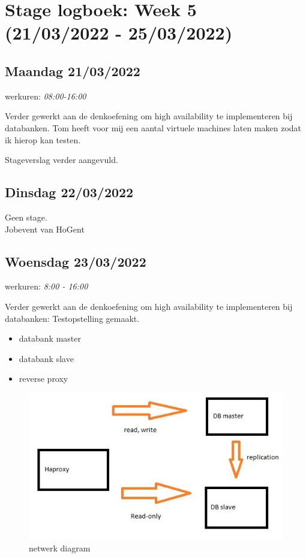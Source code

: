 \documentclass[
]{article}
\author{}
\date{}
\providecommand{\tightlist}{%
  \setlength{\itemsep}{0pt}\setlength{\parskip}{0pt}}
\begin{document}
\hypertarget{stage-logboek-week-5-21032022---25032022}{%
\section{Stage logboek: Week 5 (21/03/2022 -
25/03/2022)}\label{stage-logboek-week-5-21032022---25032022}}

\hypertarget{maandag-21032022}{%
\subsection{Maandag 21/03/2022}\label{maandag-21032022}}

werkuren: \emph{08:00-16:00}

Verder gewerkt aan de denkoefening om high availability te implementeren
bij databanken. Tom heeft voor mij een aantal virtuele machines laten
maken zodat ik hierop kan testen.

Stageverslag verder aangevuld.

\hypertarget{dinsdag-22032022}{%
\subsection{Dinsdag 22/03/2022}\label{dinsdag-22032022}}

Geen stage.\\
Jobevent van HoGent

\hypertarget{woensdag-23032022}{%
\subsection{Woensdag 23/03/2022}\label{woensdag-23032022}}

werkuren: \emph{8:00 - 16:00}

Verder gewerkt aan de denkoefening om high availability te implementeren
bij databanken: Testopstelling gemaakt.

\begin{itemize}
\tightlist
\item
  databank master
\item
  databank slave
\item
  reverse proxy
\end{itemize}

\begin{figure}
\centering
\includegraphics{../notes/img/networkdiagram_db_replication.JPG}
\caption{netwerk diagram}
\end{figure}
\end{document}
